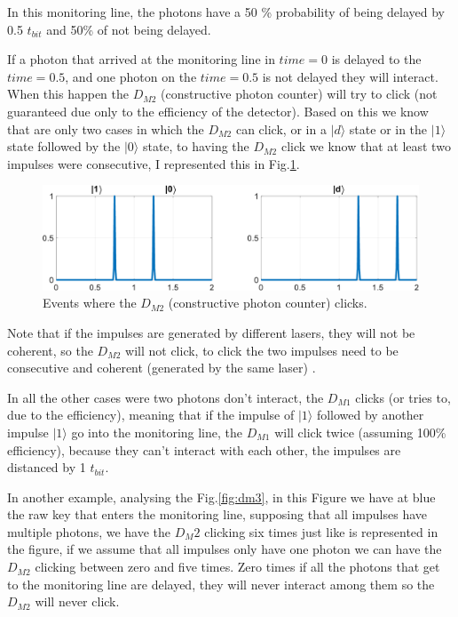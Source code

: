 \begin{refsection}
In this monitoring line, the photons have a 50 \% probability of being delayed by 0.5 $t_{bit}$ and 50\% of not being delayed. 

If a photon that arrived at the monitoring line in $time=0$ is delayed to the $time=0.5$, and one photon on the $time=0.5$ is not delayed they will interact. When this happen the $D_{M2}$ (constructive photon counter) will try to click (not guaranteed due only to the efficiency of the detector). Based on this we know that are only two cases in which the $D_{M2}$ can click, or in a $|d\rangle$ state or in the $|1\rangle$ state followed by the $|0\rangle$ state, to having the $D_{M2}$ click we know that at least two impulses were consecutive, I represented this in Fig.\ref{fig:dm2}.

\begin{figure}[hbt!]
\centering
\includegraphics[width=1\linewidth]{./sdf/tq_76558_cow_protocol/slides/figures/S2.pdf}
\caption{Events where the $D_{M2}$ (constructive photon counter) clicks.}
\label{fig:dm2}
\end{figure}

Note that if the impulses are generated by different lasers, they will not be coherent, so the $D_{M2}$ will not click, to click the two impulses need to be consecutive and coherent (generated by the same laser) \cite{rusca2018security}.

In all the other cases were two photons don't interact, the $D_{M1}$ clicks (or tries to, due to the efficiency), meaning that if the impulse of $|1\rangle$ followed by another impulse $|1\rangle$ go into the monitoring line, the $D_{M1}$ will click twice (assuming 100\% efficiency), because they can't interact with each other, the impulses are distanced by 1 $t_{bit}$.

In another example, analysing the Fig.\ref{fig:dm3}, in this Figure we have at blue the raw key that enters the monitoring line, supposing that all impulses have multiple photons, we have the $D_M2$ clicking six times just like is represented in the figure, if we assume that all impulses only have one photon we can have the $D_{M2}$ clicking between zero and five times. Zero times if all the photons that get to the monitoring line are delayed, they will never interact among them so the $D_{M2}$ will never click.


\end{refsection}
